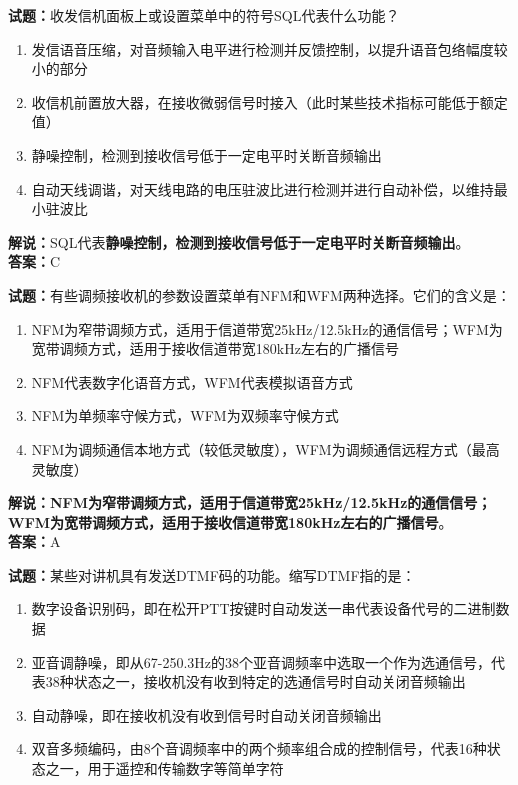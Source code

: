 \documentclass{ctexbook}
\begin{document}
\bigskip

\noindent\textbf{试题：}收发信机面板上或设置菜单中的符号SQL代表什么功能？

\begin{enumerate}[leftmargin=3em]
  \item 发信语音压缩，对音频输入电平进行检测并反馈控制，以提升语音包络幅度较小的部分
  \item 收信机前置放大器，在接收微弱信号时接入（此时某些技术指标可能低于额定值）
  \item 静噪控制，检测到接收信号低于一定电平时关断音频输出
  \item 自动天线调谐，对天线电路的电压驻波比进行检测并进行自动补偿，以维持最小驻波比
\end{enumerate}

\noindent\textbf{解说：}SQL代表\textbf{静噪控制，检测到接收信号低于一定电平时关断音频输出}。\\\noindent\textbf{答案：}C

\bigskip

\noindent\textbf{试题：}有些调频接收机的参数设置菜单有NFM和WFM两种选择。它们的含义是：

\begin{enumerate}[leftmargin=3em]
  \item NFM为窄带调频方式，适用于信道带宽25\si{\kHz}/12.5\si{\kHz}的通信信号；WFM为宽带调频方式，适用于接收信道带宽180\si{\kHz}左右的广播信号
  \item NFM代表数字化语音方式，WFM代表模拟语音方式
  \item NFM为单频率守候方式，WFM为双频率守候方式
  \item NFM为调频通信本地方式（较低灵敏度），WFM为调频通信远程方式（最高灵敏度）
\end{enumerate}

\noindent\textbf{解说：NFM为窄带调频方式，适用于信道带宽25\si{\kHz}/12.5\si{\kHz}的通信信号；WFM为宽带调频方式，适用于接收信道带宽180\si{\kHz}左右的广播信号}。\\\noindent\textbf{答案：}A

\bigskip

\noindent\textbf{试题：}某些对讲机具有发送DTMF码的功能。缩写DTMF指的是：

\begin{enumerate}[leftmargin=3em]
  \item 数字设备识别码，即在松开PTT按键时自动发送一串代表设备代号的二进制数据
  \item 亚音调静噪，即从67-250.3Hz的38个亚音调频率中选取一个作为选通信号，代表38种状态之一，接收机没有收到特定的选通信号时自动关闭音频输出
  \item 自动静噪，即在接收机没有收到信号时自动关闭音频输出
  \item 双音多频编码，由8个音调频率中的两个频率组合成的控制信号，代表16种状态之一，用于遥控和传输数字等简单字符
\end{enumerate}
\end{document}
